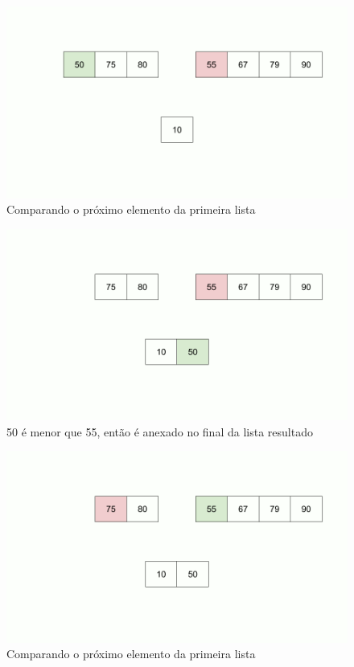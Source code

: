 \begin{figure}[!ht]
	\centering
	\includegraphics[scale=0.3]{figures/merge/merge-function-5.png}
	\caption{Comparando o próximo elemento da primeira lista}
\end{figure}
\begin{figure}[!ht]
	\centering
	\includegraphics[scale=0.3]{figures/merge/merge-function-6.png}
	\caption{50 é menor que 55, então é anexado no final da lista resultado}
\end{figure}
\begin{figure}[!ht]
	\centering
	\includegraphics[scale=0.3]{figures/merge/merge-function-8.png}
	\caption{Comparando o próximo elemento da primeira lista}
\end{figure}
